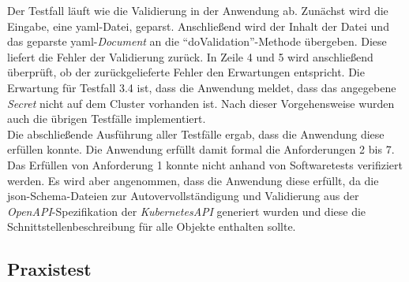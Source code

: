 Der Testfall läuft wie die Validierung in der Anwendung ab. Zunächst wird die Eingabe, eine \ac{yaml}-Datei, geparst.
Anschließend wird der Inhalt der Datei und das geparste \ac{yaml}-\textit{Document} an die ``doValidation''-Methode übergeben.
Diese liefert die Fehler der Validierung zurück. In Zeile 4 und 5 wird anschließend überprüft, ob der zurückgelieferte Fehler
den Erwartungen entspricht. Die Erwartung für Testfall 3.4 ist, dass die Anwendung meldet, dass das angegebene \textit{Secret}
nicht auf dem Cluster vorhanden ist. Nach dieser Vorgehensweise wurden auch die übrigen Testfälle implementiert.
\\
Die abschließende Ausführung aller Testfälle ergab, dass die Anwendung diese erfüllen konnte.
Die Anwendung erfüllt damit formal die Anforderungen 2 bis 7.
Das Erfüllen von Anforderung 1 konnte nicht anhand von Softwaretests verifiziert werden.
Es wird aber angenommen, dass die Anwendung diese erfüllt, da die \ac{json}-Schema-Dateien zur Autovervollständigung
und Validierung aus der \textit{OpenAPI}-Spezifikation der \textit{KubernetesAPI} generiert wurden und
diese die Schnittstellenbeschreibung für alle Objekte enthalten sollte.

\subsection{Praxistest}

